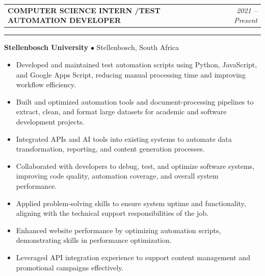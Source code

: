 \documentclass[11pt, a4paper]{article}
\begin{document}
\vspace{6pt}
\noindent
\begin{tabularx}{\linewidth}{Xr}
  \textcolor{DarkTxt}{\textbf{\large COMPUTER SCIENCE INTERN /TEST AUTOMATION DEVELOPER}} &
  \textcolor{LiteTxt}{\textit{2021 -- Present}} \\
\end{tabularx}%
{\color{DKGreen}\rule{\linewidth}{0.8pt}}%
\vspace{2pt}
\noindent\textcolor{MDGreen}{\textbf{Stellenbosch University}}\;
\textcolor{LiteTxt}{$\bullet$\; Stellenbosch, South Africa}
\vspace{3pt}
\begin{itemize}
  \item \textcolor{MidTxt}{Developed and maintained test automation scripts using Python, JavaScript, and Google Apps Script, reducing manual processing time and improving workflow efficiency.}
  \item \textcolor{MidTxt}{Built and optimized automation tools and document-processing pipelines to extract, clean, and format large datasets for academic and software development projects.}
  \item \textcolor{MidTxt}{Integrated APIs and AI tools into existing systems to automate data transformation, reporting, and content generation processes.}
  \item \textcolor{MidTxt}{Collaborated with developers to debug, test, and optimize software systems, improving code quality, automation coverage, and overall system performance.}
  \item \textcolor{MidTxt}{Applied problem-solving skills to ensure system uptime and functionality, aligning with the technical support responsibilities of the job.}
  \item \textcolor{MidTxt}{Enhanced website performance by optimizing automation scripts, demonstrating skills in performance optimization.}
  \item \textcolor{MidTxt}{Leveraged API integration experience to support content management and promotional campaigns effectively.}
\end{itemize}
\vspace{2pt}
\end{document}

